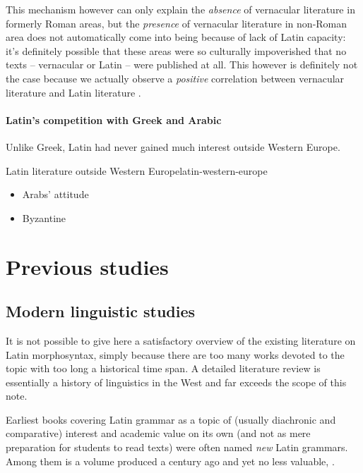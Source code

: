 \documentclass[a4paper, oneside, 12pt]{report}
\newcommand*{\citepages}[1]{pp.~{#1}}
\begin{document}
This mechanism however can only explain the \emph{absence} of vernacular literature in formerly Roman areas,
but the \emph{presence} of vernacular literature in non-Roman area 
does not automatically come into being because of lack of Latin capacity:
it's definitely possible that these areas were so culturally impoverished 
that no texts -- vernacular or Latin -- were published at all.
This however is definitely not the case 
because we actually observe a \emph{positive} correlation 
between vernacular literature and Latin literature
\citep[\citepages{167-168}]{leonhardt2013latin}.

\paragraph*{Latin's competition with Greek and Arabic}

Unlike Greek, Latin had never gained much interest outside Western Europe.

\begin{infobox}{Latin literature outside Western Europe}{latin-western-europe}
    \begin{itemize}
        \item Arabs' attitude 
        \item Byzantine
    \end{itemize}
\end{infobox}

\section{Previous studies}

\subsection{Modern linguistic studies}

It is not possible to give here a satisfactory overview of the existing literature on Latin morphosyntax,
simply because there are too many works devoted to the topic with too long a historical time span.
A detailed literature review is essentially a history of linguistics in the West
and far exceeds the scope of this note.

Earliest books covering Latin grammar as a topic of (usually diachronic and comparative) interest and academic value on its own 
(and not as mere preparation for students to read texts) were often named \emph{new} Latin grammars.
Among them is a volume produced a century ago and yet no less valuable,
\citet{allen1903allen}.
\end{document}
